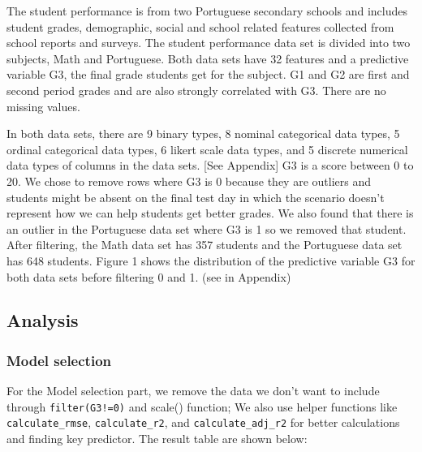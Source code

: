 \documentclass[letterpaper,9pt,twocolumn,twoside,]{pinp}
\begin{document}
The student performance is from two Portuguese secondary schools and
includes student grades, demographic, social and school related features
collected from school reports and surveys. The student performance data
set is divided into two subjects, Math and Portuguese. Both data sets
have 32 features and a predictive variable G3, the final grade students
get for the subject. G1 and G2 are first and second period grades and
are also strongly correlated with G3. There are no missing values.

In both data sets, there are 9 binary types, 8 nominal categorical data
types, 5 ordinal categorical data types, 6 likert scale data types, and
5 discrete numerical data types of columns in the data sets. {[}See
Appendix{]} G3 is a score between 0 to 20. We chose to remove rows where
G3 is 0 because they are outliers and students might be absent on the
final test day in which the scenario doesn't represent how we can help
students get better grades. We also found that there is an outlier in
the Portuguese data set where G3 is 1 so we removed that student. After
filtering, the Math data set has 357 students and the Portuguese data
set has 648 students. Figure 1 shows the distribution of the predictive
variable G3 for both data sets before filtering 0 and 1. (see in
Appendix)

\subsection{Analysis}\label{analysis}

\subsubsection{Model selection}\label{model-selection}

For the Model selection part, we remove the data we don't want to
include through \texttt{filter(G3!=0)} and scale() function; We also use
helper functions like \texttt{calculate\_rmse}, \texttt{calculate\_r2},
and \texttt{calculate\_adj\_r2} for better calculations and finding key
predictor. The result table are shown below:
\end{document}
